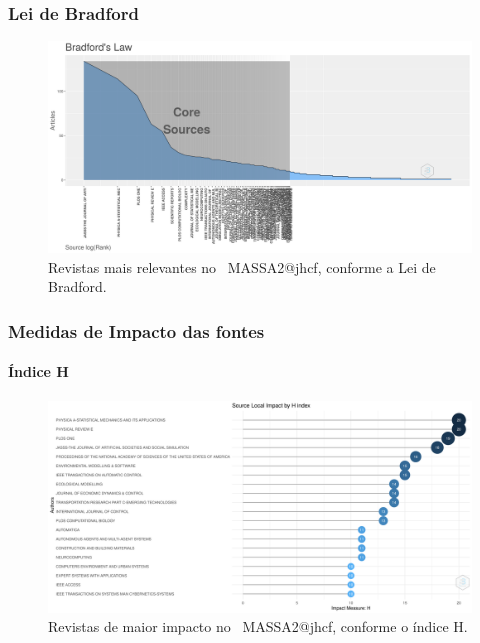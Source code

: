 \subsubsection{Lei de Bradford}

\begin{figure}
    \centering
    \includegraphics[width=1\textwidth]{exploratory-data-analysis/jhcf/PesqBibliogr/SimulacaoMultiagente/WoS-20220203/Metricas/Sources/MASSA2-Bradfords-Law.png}
    \caption{Revistas mais relevantes no  \dataset\ MASSA2@jhcf, conforme a Lei de Bradford.}
    \label{fig:MASSA2-Bradfords-Law.png}
\end{figure}

\subsubsection{Medidas de Impacto das fontes}

\paragraph{Índice H}

\begin{figure}
    \centering
    \includegraphics[width=1\textwidth]{exploratory-data-analysis/jhcf/PesqBibliogr/SimulacaoMultiagente/WoS-20220203/Metricas/Sources/MASSA2-H-Index-Source-Local-Impact.png}
    \caption{Revistas de maior impacto no  \dataset\ MASSA2@jhcf,  conforme o índice H.}
    \label{fig:MASSA2-H-Index-Source-Local-Impact.png}
\end{figure}


